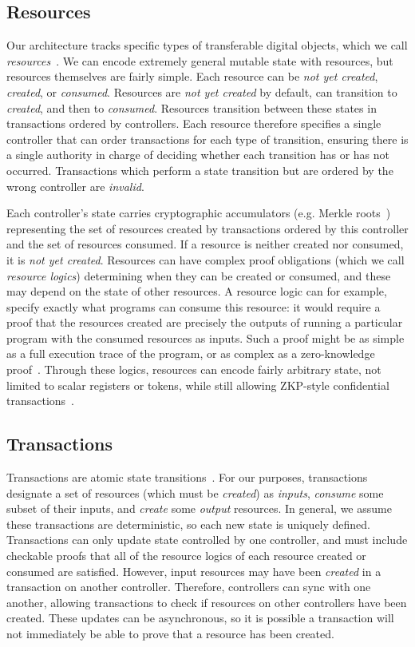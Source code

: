 \documentclass[a4paper,USenglish,cleveref, autoref, thm-restate, anonymous]{lipics-v2021}
\begin{document}
\subsection{Resources}
Our architecture tracks specific types of transferable digital objects, which we call \emph{resources}~\cite{resource}.
We can encode extremely general mutable state with resources, but resources themselves are fairly simple.
Each resource can be \emph{not yet created}, \emph{created}, or \emph{consumed}.
Resources are \emph{not yet created} by default, can transition to \emph{created}, and then to \emph{consumed}.
Resources transition between these states in transactions ordered by controllers.
Each resource therefore specifies a single controller that can order transactions for each type of transition, ensuring there is a single authority in charge of deciding whether each transition has or has not occurred.
Transactions which perform a state transition but are ordered by the wrong controller are \emph{invalid}.

Each controller's state carries cryptographic accumulators (e.g. Merkle roots~\cite{citation-needed}) representing the set of resources created by transactions ordered by this controller and the set of resources consumed.
If a resource is neither created nor consumed, it is \emph{not yet created}.
Resources can have complex proof obligations (which we call \emph{resource logics}) determining when they can be created or consumed, and these may depend on the state of other resources. %
A resource logic can for example, specify exactly what programs can consume this resource: it would require a proof that the resources created are precisely the outputs of running a particular program with the consumed resources as inputs.
Such a proof might be as simple as a full execution trace of the program, or as complex as a zero-knowledge proof~\cite{citation-needed}.
Through these logics, resources can encode fairly arbitrary state, not limited to scalar registers or tokens, while still allowing ZKP-style confidential transactions~\cite{resource}.

\subsection{Transactions}
Transactions are atomic state transitions~\cite{smr,statemachine}.
For our purposes, transactions designate a set of resources (which must be \emph{created}) as \emph{inputs}, \emph{consume} some subset of their inputs, and \emph{create} some \emph{output} resources.
In general, we assume these transactions are deterministic, so each new state is uniquely defined.
Transactions can only update state controlled by one controller, and must include checkable proofs that all of the resource logics of each resource created or consumed are satisfied.
However, input resources may have been \emph{created} in a transaction on another controller.
Therefore, controllers can sync with one another, allowing transactions to check if resources on other controllers have been created.
These updates can be asynchronous, so it is possible a transaction will not immediately be able to prove that a resource has been created.
\end{document}

